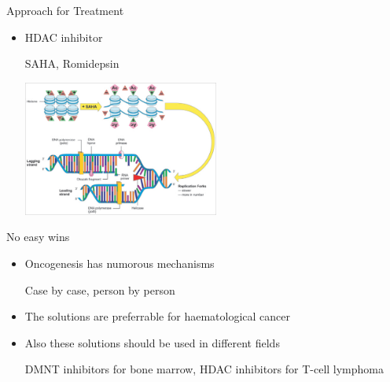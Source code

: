 \documentclass{beamer}
\begin{document}
    \begin{frame}{Approach for Treatment}
        \begin{itemize}
            \item HDAC inhibitor
                        
                  {\small SAHA, Romidepsin}

                  \vspace{1em}
                  \begin{center}
                    \includegraphics[height=12em]{hdac_saha_2}

                    {\footnotesize }
                  \end{center}
        \end{itemize}
    \end{frame}

    \begin{frame}{No easy wins}
        \begin{itemize}
            \item Oncogenesis has numorous mechanisms
            
                  \vspace{0.5em}
                  {\footnotesize Case by case, person by person}
                  \vspace{0.5em}

            \item The solutions are preferrable for haematological cancer
            \item Also these solutions should be used in different fields
            
                  \vspace{0.5em}
                  {\footnotesize DMNT inhibitors for bone marrow, HDAC inhibitors for T-cell lymphoma}
                  \vspace{0.5em}
        \end{itemize}
    \end{frame}
\end{document}
